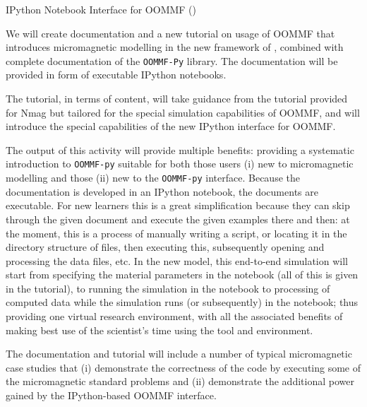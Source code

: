 \begin{workpackage}
\begin{wpdelivs}
  \begin{wpdeliv}[due=15,id=oommf-nb,dissem=??,nature=??]
      {IPython Notebook Interface for OOMMF (\OOMMFNB{})}
\end{wpdeliv}
\end{wpdelivs}

\begin{tasklist}
\begin{task}[title=OOMMF case study: \OOMMFNB{} tutorial and documentation]

  We will create documentation and a new tutorial on usage of OOMMF
  that introduces micromagnetic modelling in the new framework of
  \OOMMFNB{}, combined with complete documentation of the
  \texttt{OOMMF-Py} library. The documentation will be provided in
  form of executable IPython notebooks.

  The tutorial, in terms of content, will take guidance from the
  tutorial provided for Nmag \cite{Nmag-tutorial-url} but tailored for the
  special simulation capabilities of OOMMF, and will introduce the
  special capabilities of the new IPython interface for OOMMF.

  The output of this activity will provide multiple benefits:
  providing a systematic introduction to \texttt{OOMMF-py} suitable for both
  those users (i) new to micromagnetic modelling and those (ii) new to
  the \texttt{OOMMF-py} interface. Because the documentation is developed in an
  IPython notebook, the documents are executable. For new learners
  this is a great simplification because they can skip through the
  given document and execute the given examples there and then: at the
  moment, this is a process of manually writing a script, or locating
  it in the directory structure of files, then executing this,
  subsequently opening and processing the data files, etc. In the new
  model, this end-to-end simulation will start from specifying the
  material parameters in the notebook (all of this is given in the
  tutorial), to running the simulation in the notebook to processing
  of computed data while the simulation runs (or subsequently) in the
  notebook; thus providing one virtual research environment, with all
  the associated benefits of making best use of the scientist's time
  using the tool and environment.

  The documentation and tutorial will include a number of typical
  micromagnetic case studies that (i) demonstrate the correctness of
  the code by executing some of the micromagnetic standard problems
  and (ii) demonstrate the additional power gained by the
  IPython-based OOMMF interface.
\end{task}
\end{tasklist}


\end{workpackage}
